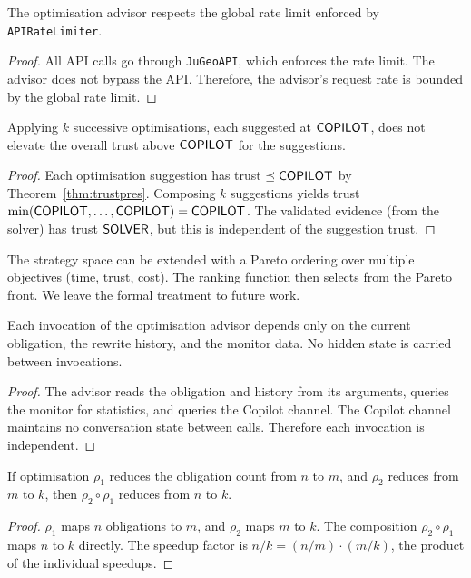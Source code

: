 \documentclass[11pt]{article}
\begin{document}
\begin{lemma}%
\label{lem:optratelimit}
The optimisation advisor respects the global rate limit
enforced by \texttt{APIRateLimiter}.
\end{lemma}
\begin{proof}
All API calls go through \texttt{JuGeoAPI}, which enforces
the rate limit.  The advisor does not bypass the API.
Therefore, the advisor's request rate is bounded by the
global rate limit.
\end{proof}

\begin{lemma}%
\label{lem:trustnoaccum}
Applying $k$ successive optimisations, each suggested at
$\mathsf{COPILOT}$, does not elevate the overall trust above
$\mathsf{COPILOT}$ for the suggestions.
\end{lemma}
\begin{proof}
Each optimisation suggestion has trust $\preceq \mathsf{COPILOT}$
by Theorem~\ref{thm:trustpres}.  Composing $k$ suggestions
yields trust $\min(\mathsf{COPILOT}, \ldots, \mathsf{COPILOT}) = \mathsf{COPILOT}$.
The validated evidence (from the solver) has trust $\mathsf{SOLVER}$,
but this is independent of the suggestion trust.
\end{proof}

\begin{remark}
The strategy space can be extended with a Pareto
ordering over multiple objectives (time, trust, cost).
The ranking function then selects from the Pareto front.
We leave the formal treatment to future work.
\end{remark}

\begin{lemma}%
\label{lem:optstateless}
Each invocation of the optimisation advisor depends only on the
current obligation, the rewrite history, and the monitor data.
No hidden state is carried between invocations.
\end{lemma}
\begin{proof}
The advisor reads the obligation and history from its arguments,
queries the monitor for statistics, and queries the Copilot channel.
The Copilot channel maintains no conversation state between calls.
Therefore each invocation is independent.
\end{proof}

\begin{lemma}%
\label{lem:searchcomp}
If optimisation $\rho_1$ reduces the obligation count from $n$ to $m$,
and $\rho_2$ reduces from $m$ to $k$, then $\rho_2 \circ \rho_1$
reduces from $n$ to $k$.
\end{lemma}
\begin{proof}
$\rho_1$ maps $n$ obligations to $m$, and $\rho_2$ maps $m$ to $k$.
The composition $\rho_2 \circ \rho_1$ maps $n$ to $k$ directly.
The speedup factor is $n/k = (n/m) \cdot (m/k)$, the product of the
individual speedups.
\end{proof}
\end{document}
